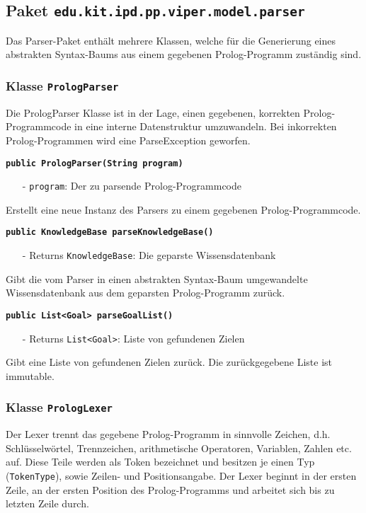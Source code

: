 \documentclass[parskip=full,11pt,twoside]{scrartcl}
\begin{document}
\newpage
\subsection{Paket \texttt{edu.kit.ipd.pp.viper.model.parser}}

Das Parser-Paket enthält mehrere Klassen, welche für die Generierung eines abstrakten Syntax-Baums aus einem gegebenen Prolog-Programm zuständig sind.
\newpage
\newpage
\subsubsection{Klasse \texttt{PrologParser}}

Die PrologParser Klasse ist in der Lage, einen gegebenen, korrekten Prolog-Programmcode in eine interne Datenstruktur umzuwandeln. Bei inkorrekten Prolog-Programmen wird eine ParseException geworfen.

\textbf{\texttt{public PrologParser(String program)}}
\begin{itemize}[noitemsep]
	\item[-] \texttt{program}: Der zu parsende Prolog-Programmcode
\end{itemize}
Erstellt eine neue Instanz des Parsers zu einem gegebenen Prolog-Programmcode.

\textbf{\texttt{public KnowledgeBase parseKnowledgeBase()}}
\begin{itemize}[noitemsep]
	\item[-] Returns \texttt{KnowledgeBase}: Die geparste Wissensdatenbank
\end{itemize}
Gibt die vom Parser in einen abstrakten Syntax-Baum umgewandelte Wissensdatenbank aus dem geparsten Prolog-Programm zurück.

\textbf{\texttt{public List<Goal> parseGoalList()}}
\begin{itemize}[noitemsep]
	\item[-] Returns \texttt{List<Goal>}: Liste von gefundenen Zielen
\end{itemize}
Gibt eine Liste von gefundenen Zielen zurück. Die zurückgegebene Liste ist immutable.

\subsubsection{Klasse \texttt{PrologLexer}}

Der Lexer trennt das gegebene Prolog-Programm in sinnvolle Zeichen, d.h. Schlüsselwörtel, Trennzeichen, arithmetische Operatoren, Variablen, Zahlen etc. auf. Diese Teile werden als Token bezeichnet und besitzen je einen Typ (\texttt{TokenType}), sowie Zeilen- und Positionsangabe. Der Lexer beginnt in der ersten Zeile, an der ersten Position des Prolog-Programms und arbeitet sich bis zu letzten Zeile durch.
\end{document}
